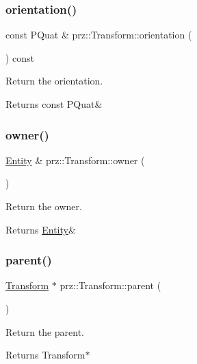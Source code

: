 \subsubsection{\texorpdfstring{orientation()}{orientation()}}
{\footnotesize\ttfamily const P\+Quat \& prz\+::\+Transform\+::orientation (\begin{DoxyParamCaption}{ }\end{DoxyParamCaption}) const}



Return the orientation. 

\begin{DoxyReturn}{Returns}
const P\+Quat\& 
\end{DoxyReturn}
\mbox{\label{classprz_1_1_transform_a16403133940713f900fcc5b66300a10b}} 
\subsubsection{\texorpdfstring{owner()}{owner()}}
{\footnotesize\ttfamily \mbox{\hyperlink{classprz_1_1_entity}{Entity}} \& prz\+::\+Transform\+::owner (\begin{DoxyParamCaption}{ }\end{DoxyParamCaption})}



Return the owner. 

\begin{DoxyReturn}{Returns}
\mbox{\hyperlink{classprz_1_1_entity}{Entity}}\& 
\end{DoxyReturn}
\mbox{\label{classprz_1_1_transform_a9acc3ca9bcab25fba6ab51727c240432}} 
\subsubsection{\texorpdfstring{parent()}{parent()}}
{\footnotesize\ttfamily \mbox{\hyperlink{classprz_1_1_transform}{Transform}} $\ast$ prz\+::\+Transform\+::parent (\begin{DoxyParamCaption}{ }\end{DoxyParamCaption})}



Return the parent. 

\begin{DoxyReturn}{Returns}
Transform$\ast$ 
\end{DoxyReturn}
\mbox{\label{classprz_1_1_transform_adb37c1546b894feaee1108c3fe80d52e}} 
